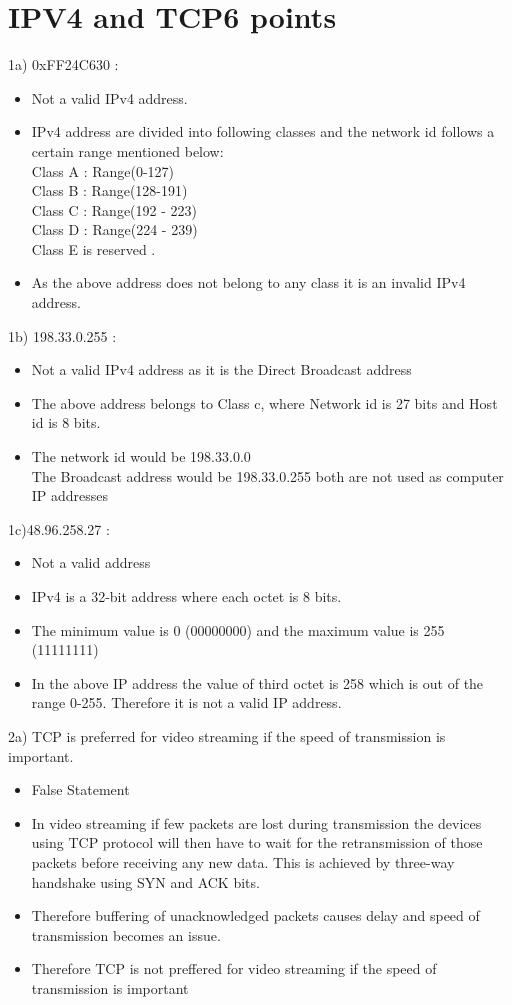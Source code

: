 \documentclass{resources/WeSTassignment}
\begin{document}
\section{IPV4 and TCP\hfill{6 points}}
1a) 0xFF24C630 :  
\begin{itemize}
               \item Not a valid IPv4 address.
               \item IPv4 address are divided into following classes and the network id follows a certain range mentioned below: \\ Class A : Range(0-127)\\ Class B : Range(128-191) \\ Class C : Range(192 - 223) \\ Class D : Range(224 - 239) \\ Class E is reserved .
               \item As the above address does not belong to any class it is an invalid IPv4 address.
            \end{itemize}
1b) 198.33.0.255 :
            \begin{itemize}
			\item Not a valid IPv4 address as it is the Direct Broadcast address
            \item The above address belongs to Class c, where Network id is 27 bits and Host id is 8 bits.
            \item The network id would be 198.33.0.0\\The Broadcast address would be 198.33.0.255 both are not used as computer IP addresses
            \end{itemize}
1c)48.96.258.27 :
            \begin{itemize}
            \item  Not a valid address
            \item IPv4 is a 32-bit address where each octet is 8 bits.
            \item The minimum value is 0 (00000000) and the maximum value is 255 (11111111)
            \item In the above IP address the value of third octet is 258 which is out of the range 0-255. Therefore it is not a valid IP address.
            \end{itemize}
2a) TCP is preferred for video streaming if the speed of transmission is important.
			\begin{itemize}
			\item False Statement
			\item In video streaming if few packets are lost during transmission the devices using TCP protocol will then have to wait for the retransmission of those packets before receiving any new data. This is achieved by three-way handshake using SYN and ACK bits.
			\item Therefore buffering of unacknowledged packets causes delay and speed of transmission becomes an issue.
			\item Therefore TCP is not preffered for video streaming if the speed of transmission is important
			\end{itemize}
\end{document}
